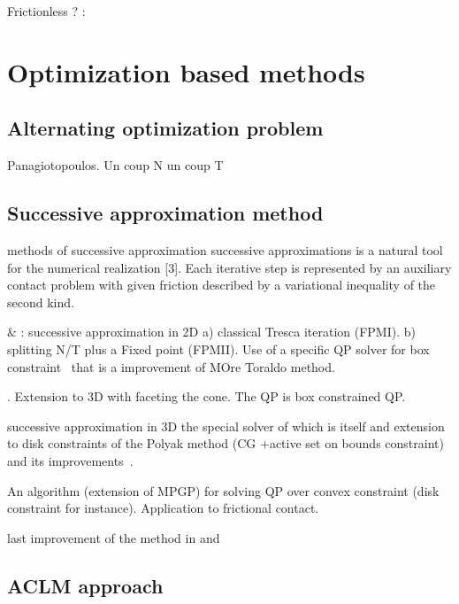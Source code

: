 Frictionless ? :\cite{Miyamura.ea_IJNME2010,Temizer.ea_CMAME2014}
 

\section{Optimization based methods}
\label{Sec:OptimisationBasedMethods}

\subsection{Alternating optimization problem}
Panagiotopoulos. Un coup N un coup T

\subsection{Successive approximation  method}

methods of successive approximation successive approximations is a natural tool for the numerical realization [3]. Each iterative step is represented by an auxiliary contact problem with given friction described by a variational inequality of the second kind.


\cite{Haslinger.ea_CMAME2002} \& \cite{Dostal_JCAM2002} : successive approximation in 2D a) classical Tresca iteration (FPMI).  b) splitting N/T plus a Fixed point (FPMII). Use of a specific QP solver for box constraint~\cite{Dostal_SIOPT1997} that is a improvement of MOre Toraldo method.

\cite{Haslinger.ea_JCAM2004}.  Extension to 3D with faceting the cone. The QP is box constrained QP.


\cite{Haslinger.ea_MCS2012}  successive approximation in 3D the special solver of \cite{Kucera_OMS2007,Kucera_SIOPT2008} which is itself and extension to disk constraints of the Polyak method (CG +active set on bounds constraint) and its improvements~\cite{Dostal_SIOPT1997,Dostal.Schoberl_COA2005}.



\cite{Dostal.Kozubek_MP2012} An algorithm (extension of MPGP) for solving QP over convex constraint (disk constraint for instance). Application to frictional contact. 


\cite{Dostal.Kucera_SIOPT2010} last improvement of the method in \cite{Dostal.Kozubek_MP2012} and \cite{Kucera_SIOPT2008}




\subsection{ACLM approach}

